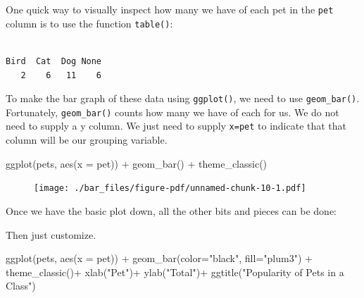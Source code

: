 \documentclass[
  letterpaper,
  DIV=11,
  numbers=noendperiod]{scrreprt}
\newenvironment{Shaded}{\begin{snugshade}}{\end{snugshade}}
\newcommand{\AttributeTok}[1]{\textcolor[rgb]{0.40,0.45,0.13}{#1}}
\newcommand{\FunctionTok}[1]{\textcolor[rgb]{0.28,0.35,0.67}{#1}}
\newcommand{\NormalTok}[1]{\textcolor[rgb]{0.00,0.23,0.31}{#1}}
\newcommand{\SpecialCharTok}[1]{\textcolor[rgb]{0.37,0.37,0.37}{#1}}
\newcommand{\StringTok}[1]{\textcolor[rgb]{0.13,0.47,0.30}{#1}}
\begin{document}
One quick way to visually inspect how many we have of each pet in the
\texttt{pet} column is to use the function \texttt{table()}:

\begin{Shaded}
\end{Shaded}

\begin{verbatim}

Bird  Cat  Dog None 
   2    6   11    6 
\end{verbatim}

To make the bar graph of these data using \texttt{ggplot()}, we need to
use \texttt{geom\_bar()}. Fortunately, \texttt{geom\_bar()} counts how
many we have of each for us. We do not need to supply a y column. We
just need to supply \texttt{x=pet} to indicate that that column will be
our grouping variable.

\begin{Shaded}
\begin{Highlighting}[]
\FunctionTok{ggplot}\NormalTok{(pets, }\FunctionTok{aes}\NormalTok{(}\AttributeTok{x =}\NormalTok{ pet)) }\SpecialCharTok{+} 
  \FunctionTok{geom\_bar}\NormalTok{() }\SpecialCharTok{+}
  \FunctionTok{theme\_classic}\NormalTok{()}
\end{Highlighting}
\end{Shaded}

\begin{figure}[H]

{\centering \texttt{[image: ./bar\_files/figure-pdf/unnamed-chunk-10-1.pdf]}

}

\end{figure}

Once we have the basic plot down, all the other bits and pieces can be
done:

Then just customize.

\begin{Shaded}
\begin{Highlighting}[]
\FunctionTok{ggplot}\NormalTok{(pets, }\FunctionTok{aes}\NormalTok{(}\AttributeTok{x =}\NormalTok{ pet)) }\SpecialCharTok{+} 
  \FunctionTok{geom\_bar}\NormalTok{(}\AttributeTok{color=}\StringTok{"black"}\NormalTok{, }\AttributeTok{fill=}\StringTok{"plum3"}\NormalTok{) }\SpecialCharTok{+}
  \FunctionTok{theme\_classic}\NormalTok{()}\SpecialCharTok{+}
  \FunctionTok{xlab}\NormalTok{(}\StringTok{"Pet"}\NormalTok{)}\SpecialCharTok{+}
  \FunctionTok{ylab}\NormalTok{(}\StringTok{"Total"}\NormalTok{)}\SpecialCharTok{+}
  \FunctionTok{ggtitle}\NormalTok{(}\StringTok{"Popularity of Pets in a Class"}\NormalTok{)}
\end{Highlighting}
\end{Shaded}
\end{document}
